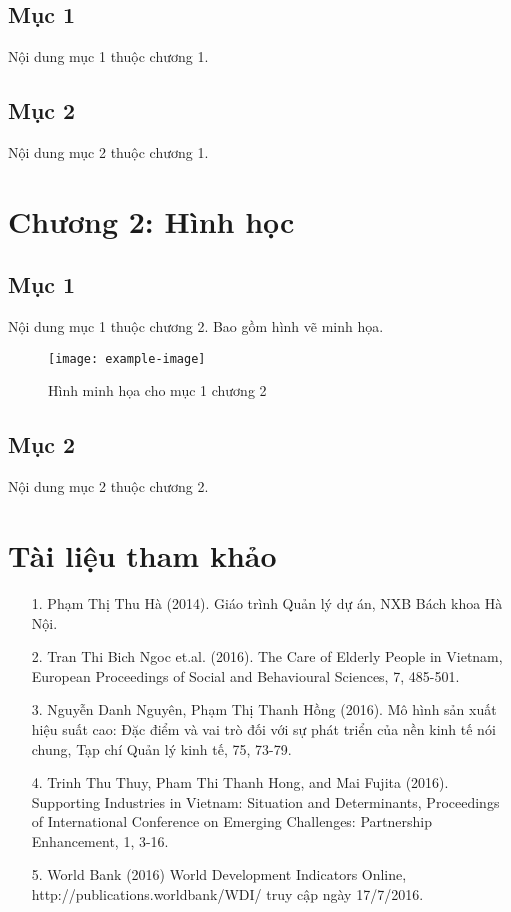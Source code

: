 \documentclass[a4paper,oneside]{book}
\begin{document}
\section{Mục 1}
Nội dung mục 1 thuộc chương 1.

\section{Mục 2}
Nội dung mục 2 thuộc chương 1.

\chapter{Chương 2: Hình học}
\section{Mục 1}
Nội dung mục 1 thuộc chương 2. Bao gồm hình vẽ minh họa.

\begin{figure}[h]
    \centering
    \texttt{[image: example-image]} %
    \caption{Hình minh họa cho mục 1 chương 2}
    \label{fig:example}
\end{figure}

\section{Mục 2}
Nội dung mục 2 thuộc chương 2.

\chapter*{Tài liệu tham khảo}
\begin{itemize}
    \item [1.] Phạm Thị Thu Hà (2014). Giáo trình Quản lý dự án, NXB Bách khoa Hà Nội.
    \item [2.] Tran Thi Bich Ngoc et.al. (2016). The Care of Elderly People in Vietnam, European Proceedings of Social and Behavioural Sciences, 7, 485-501.
    \item [3.] Nguyễn Danh Nguyên, Phạm Thị Thanh Hồng (2016). Mô hình sản xuất hiệu suất cao: Đặc điểm và vai trò đối với sự phát triển của nền kinh tế nói chung, Tạp chí Quản lý kinh tế, 75, 73-79.
    \item [4.] Trinh Thu Thuy, Pham Thi Thanh Hong, and Mai Fujita (2016). Supporting Industries in Vietnam: Situation and Determinants, Proceedings of International Conference on Emerging Challenges: Partnership Enhancement, 1, 3-16.
    \item [5.] World Bank (2016) World Development Indicators Online, http://publications.worldbank/WDI/ truy cập ngày 17/7/2016.
\end{itemize}
\end{document}
